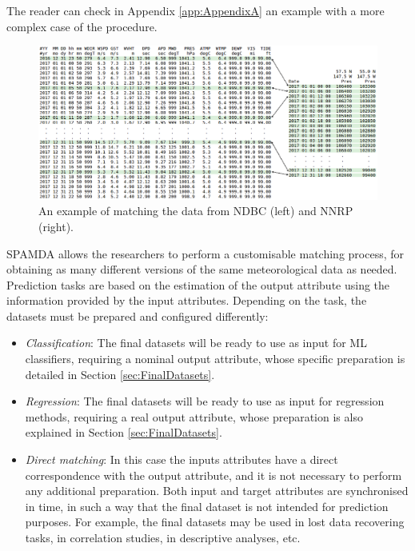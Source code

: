 \documentclass[energies,article,submit,moreauthors,pdftex]{Definitions/mdpi}
\begin{document}
				The reader can check in Appendix \ref{app:AppendixA} an example with a more complex case of the procedure.
				\begin{figure}[ht!]
					\centering
					\includegraphics[scale=0.38]{figures/FigureMatchingProcess.png}
					\caption{An example of matching the data from NDBC (left) and NNRP (right).}
					\label{fig:matchingProcess}
				\end{figure}
				
				SPAMDA allows the researchers to perform a customisable matching process, for obtaining as many different versions of the same meteorological data as needed.
				Prediction tasks are based on the estimation of the output attribute using the information provided by the input attributes. Depending on the task, the datasets must be prepared and configured differently:				
				\begin{itemize}
					\item \textit{Classification}: The final datasets will be ready to use as input for ML classifiers, requiring a nominal output attribute, whose specific preparation is detailed in Section \ref{sec:FinalDatasets}.
					\item \textit{Regression}: The final datasets will be ready to use as input for regression methods, requiring a real output attribute, whose preparation is also explained in Section \ref{sec:FinalDatasets}.
					\item \textit{Direct matching}: In this case the inputs attributes have a direct correspondence with the output attribute, and it is not necessary to perform any additional preparation. Both input and target attributes are synchronised in time, in such a way that the final dataset is not intended for prediction purposes. For example, the final datasets may be used in lost data recovering tasks, in correlation studies, in descriptive analyses, etc.
				\end{itemize}
				
\end{document}
